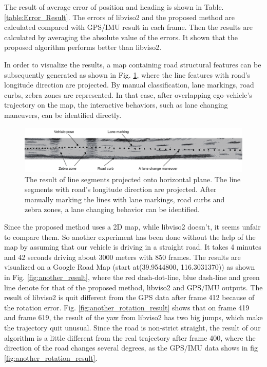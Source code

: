\documentclass[letterpaper, 10 pt, conference]{ieeeconf}  %
\begin{document}
The result of average error of position and heading is shown in Table. \ref{table:Error_Result}. The errors of libviso2 and the proposed method are calculated compared with GPS/IMU result in each frame. Then the results are calculated by averaging the absolute value of the errors. It shown that the proposed algorithm performs better than libviso2.

In order to visualize the results, a map containing road structural features can be subsequently generated as shown in Fig. \ref{fig:lineProjection}, where the line features with road's longitude direction are projected. By manual classification, lane markings, road curbs, zebra zones are represented. In that case, after overlapping ego-vehicle's trajectory on the map, the interactive behaviors, such as lane changing maneuvers, can be identified directly.

\begin{figure}
\centering
\includegraphics[width=1\linewidth]{source//Final//horizon_line.pdf}
\caption{The result of line segments projected onto horizontal plane. The line segments with road's longitude direction are projected. After manually marking the lines with lane markings, road curbs and zebra zones, a lane changing behavior can be identified.}
\label{fig:lineProjection}
\end{figure}

Since the proposed method uses a 2D map, while libviso2 doesn't, it seems unfair to compare them. So another experiment has been done without the help of the map by assuming that our vehicle is driving in a straight road. It takes 4 minutes and 42 seconds driving about 3000 meters with 850 frames. The results are visualized on a Google Road Map (start at(39.9544800, 116.3031370)) as shown in Fig. \ref{fig:another_result}, where the red dash-dot-line, blue dash-line and green line denote for that of the proposed method, libviso2 and GPS/IMU outputs. The result of libviso2 is quit different from the GPS data after frame 412 because of the rotation error. Fig. \ref{fig:another_rotation_result} shows that on frame 419 and frame 619, the result of the yaw from libviso2 has two big jumps, which make the trajectory quit unusual. Since the road is non-strict straight, the result of our algorithm is a little different from the real trajectory after frame 400, where the direction of the road changes several degrees, as the GPS/IMU data shows in fig \ref{fig:another_rotation_result}.
\end{document}
